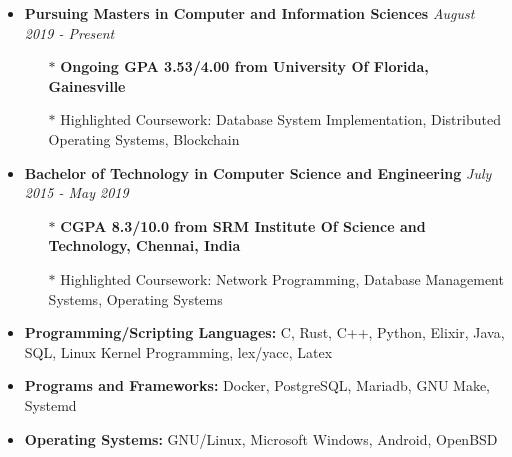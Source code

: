 \documentclass[10pt,a4paper]{article}
\begin{document}
\begin{tcolorbox}[enhanced,attach boxed title to top left={yshift=-3mm,yshifttext=-1mm},
		colback=aliceblue,colframe=blue,colbacktitle=blue,
		title=Education,fonttitle=\large\bfseries,
	boxed title style={size=small,colframe=blue} ]
	
	\begin{itemize}[noitemsep,nolistsep,leftmargin=0pt]
	    \item{\textbf{Pursuing Masters in Computer and Information Sciences} \hfill \textit{August 2019 - Present}}
	\begin{itemize}[leftmargin=*]
	\setlength\itemsep{-0.25em}
		\item[$\ast$]{\textbf{Ongoing GPA 3.53/4.00 from University Of Florida, Gainesville}}
		\item[$\ast$]{Highlighted Coursework: Database System Implementation, Distributed Operating Systems, Blockchain}
	\end{itemize}
	\item{\textbf{Bachelor of Technology in Computer Science and Engineering} \hfill \textit{July 2015 - May 2019}}
	\begin{itemize}[leftmargin=*]
	\setlength\itemsep{-0.25em}
		\item[$\ast$]{\textbf{CGPA 8.3/10.0 from SRM Institute Of Science and Technology, Chennai, India}}
		\item[$\ast$]{Highlighted Coursework: Network Programming, Database Management Systems, Operating Systems}
	\end{itemize}
	\end{itemize}
\end{tcolorbox}

\begin{tcolorbox}[enhanced,attach boxed title to top left={yshift=-3mm,yshifttext=-1mm},
		colback=aliceblue,colframe=blue,colbacktitle=blue,
		title=Technical Skills\setlength\itemsep{-0.25em},fonttitle=\large\bfseries,
	boxed title style={size=small,colframe=blue} ]

    \begin{itemize}[noitemsep,nolistsep,leftmargin=0pt]
\item{\textbf{Programming/Scripting Languages:} C, Rust, C++, Python, Elixir, Java, SQL, Linux Kernel Programming, lex/yacc, Latex}
\item{\textbf{Programs and Frameworks:} Docker, PostgreSQL, Mariadb, GNU Make, Systemd}
\item{\textbf{Operating Systems:} GNU/Linux, Microsoft Windows, Android, OpenBSD}

\end{itemize}
\end{tcolorbox}
\end{document}
